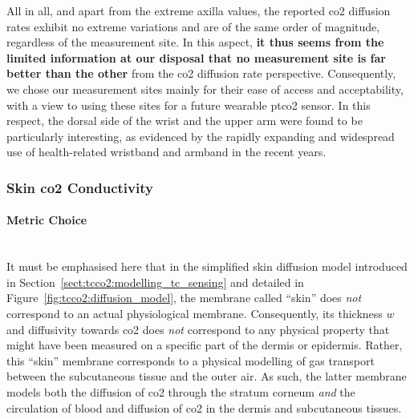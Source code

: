 All in all, and apart from the extreme axilla values, the reported \gls{co2} diffusion rates exhibit no extreme variations and are of the same order of magnitude, regardless of the measurement site. In this aspect, \textbf{it thus seems from the limited information at our disposal that no measurement site is far better than the other} from the \gls{co2} diffusion rate perspective. Consequently, we chose our measurement sites mainly for their ease of access and acceptability, with a view to using these sites for a future wearable \gls{ptco2} sensor. In this respect, the dorsal side of the wrist and the upper arm were found to be particularly interesting, as evidenced by the rapidly expanding and widespread use of health-related wristband and armband in the recent years\cite{eidan2018, soon2020, cosoli2020}.

\subsubsection{Skin \texorpdfstring{\gls{co2}}{CO2} Conductivity}

\paragraph{Metric Choice}\label{sect:tcco2:k_metric_choice}\mbox{}\\

It must be emphasised here that in the simplified skin diffusion model introduced in Section~\ref{sect:tcco2:modelling_tc_sensing} and detailed in Figure~\ref{fig:tcco2:diffusion_model}, the membrane called \enquote{skin} does \emph{not} correspond to an actual physiological membrane. Consequently, its thickness $w$ and diffusivity towards \gls{co2} does \emph{not} correspond to any physical property that might have been measured on a specific part of the dermis or epidermis. Rather, this \enquote{skin} membrane corresponds to a physical modelling of gas transport between the subcutaneous tissue and the outer air. As such, the latter membrane models both the diffusion of \gls{co2} through the stratum corneum \emph{and} the circulation of blood and diffusion of \gls{co2} in the dermis and subcutaneous tissues.

